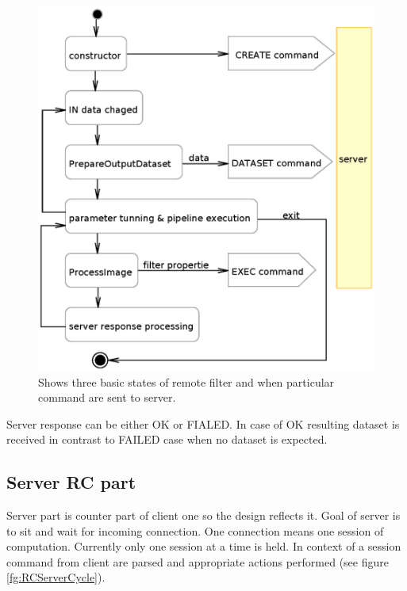 \begin{figure}
    \centering
    \includegraphics[width=12cm]{data/RCClientCycle}
    \caption[Remote Medv4D filter]{Shows three basic states of remote filter and when particular command are sent to server.}
    \label{fg:RCClientCycle}
\end{figure}

Server response can be either OK or FIALED.
In case of OK resulting dataset is received in contrast to FAILED case when no dataset is expected.

\subsection{Server RC part}

Server part is counter part of client one so the design reflects it.
Goal of server is to sit and wait for incoming connection.
One connection means one session of computation.
Currently only one session at a time is held.
In context of a session command from client are parsed and appropriate actions performed (see figure \ref{fg:RCServerCycle}).


